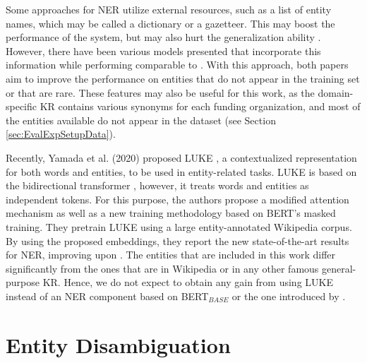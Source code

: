 \documentclass{report}
\theoremstyle{definition}
\theoremstyle{remark}
\begin{document}
Some approaches for NER utilize external resources, such as a list of entity names, which may be called a dictionary or a gazetteer. This may boost the performance of the system, but may also hurt the generalization ability \cite{NERsurvey}. However, there have been various models presented \cite{NERgazetteer, NERDict} that incorporate this information while performing comparable to \cite{flairpaper}. With this approach, both papers \cite{NERgazetteer, NERDict} aim to improve the performance on entities that do not appear in the training set or that are rare. These features may also be useful for this work, as the domain-specific KR contains various synonyms for each funding organization, and most of the entities available do not appear in the dataset (see Section \ref{sec:EvalExpSetupData}).

Recently, Yamada et al. (2020) proposed LUKE \cite{LUKE}, a contextualized representation for both words and entities, to be used in entity-related tasks. LUKE is based on the bidirectional transformer \cite{transformer}, however, it treats words and entities as independent tokens. For this purpose, the authors propose a modified attention mechanism as well as a new training methodology based on BERT's masked training. They pretrain LUKE using a large entity-annotated Wikipedia corpus. By using the proposed embeddings, they report the new state-of-the-art results for NER, improving upon \cite{flairpaper}. The entities that are included in this work differ significantly from the ones that are in Wikipedia or in any other famous general-purpose KR. Hence, we do not expect to obtain any gain from using LUKE instead of an NER component based on BERT$_{BASE}$ or the one introduced by \cite{flairpaper}.

\section{Entity Disambiguation}
\label{sota2}
\end{document}
